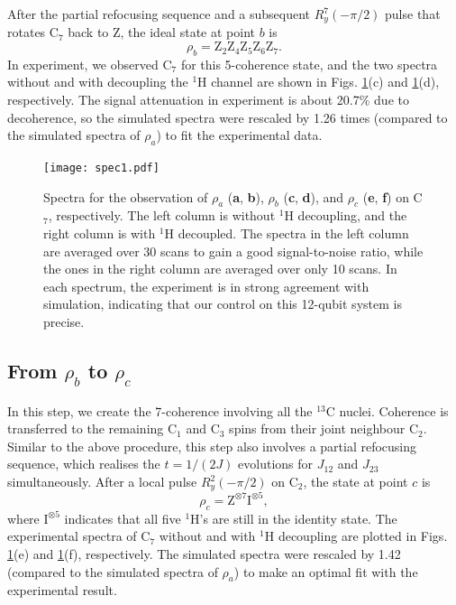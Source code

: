 \documentclass[twocolumn,reprint, amsmath,amssymb,showpacs,superscriptaddress]{revtex4-1}
\newcommand{\be}{\begin{equation}}
\newcommand{\ee}{\end{equation}}
\begin{document}
After the partial refocusing sequence and a subsequent $R_y^7\left( -\pi/2 \right)$ pulse that rotates C$_7$ back to Z, the ideal state at point $b$ is
\be
\rho_b = \text{Z}_2\text{Z}_4\text{Z}_5\text{Z}_6\text{Z}_7.
\label{rhob}
\ee
In experiment, we observed C$_7$ for this 5-coherence state, and the two spectra without and with decoupling the $^1$H channel are shown in Figs. \ref{spec1}(c) and \ref{spec1}(d), respectively. The signal attenuation in experiment is about 20.7\% due to decoherence, so the simulated spectra were rescaled by 1.26 times (compared to the simulated spectra of $\rho_a$) to fit the experimental data.

\begin{figure}
\begin{center}
\texttt{[image: spec1.pdf]}
\end{center}
\makeatletter
\renewcommand{\thefigure}{S\@arabic\c@figure}
\makeatother
\caption{Spectra for the observation of $\rho_a$ (\textbf{a}, \textbf{b}), $\rho_b$ (\textbf{c}, \textbf{d}), and $\rho_c$ (\textbf{e}, \textbf{f}) on C$_7$, respectively. The left column is without $^1$H decoupling, and the right column is with $^1$H decoupled. The spectra in the left column are averaged over 30 scans to gain a good signal-to-noise ratio, while the ones in the right column are averaged over only 10 scans. In each spectrum, the experiment is in strong agreement with simulation, indicating that our control on this 12-qubit system is precise. }
\label{spec1}
\end{figure}

\subsection{From $\rho_b$ to $\rho_c$}


In this step, we create the 7-coherence involving all the $^{13}$C nuclei. Coherence is transferred to the remaining C$_1$ and C$_3$ spins from their joint neighbour C$_2$. Similar to the above procedure, this step also involves a partial refocusing sequence, which realises the $t = 1/(2J)$ evolutions for $J_{12}$ and $J_{23}$ simultaneously. After a local pulse $R_y^2\left( -\pi/2 \right)$ on C$_2$, the state at point $c$ is
\be
\rho_c = \text{Z}^{\otimes 7}\text{I}^{\otimes 5},
\label{rhoc}
\ee
where $\text{I}^{\otimes 5}$ indicates that all five $^1$H's are still in the identity state. The experimental spectra of C$_7$ without and with $^1$H decoupling are plotted in Figs. \ref{spec1}(e) and \ref{spec1}(f), respectively. The simulated spectra were rescaled by 1.42 (compared to the simulated spectra of $\rho_a$) to make an optimal fit with the experimental result.
\end{document}
